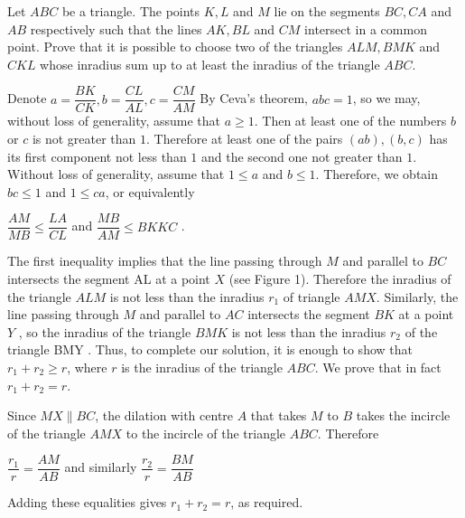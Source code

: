 \documentclass{subfile}
\begin{document}
	\begin{problem}
		Let $ABC$ be a triangle. The points $K, L$ and $M$ lie on the segments $BC, CA$ and $AB$ respectively such that the lines $AK, BL$ and $CM$ intersect in a common point. Prove that it is possible to choose two of the triangles $ALM, BMK$ and $CKL$ whose inradius sum up to at least the inradius of the triangle $ABC$.
	\end{problem}
	\begin{solution}
		 Denote $a=\dfrac{BK}{CK},b=\dfrac{CL}{AL},c=\dfrac{CM}{AM}$
		 By Ceva's theorem, $abc=1$, so we may, without loss of generality, assume that $a\geq1$. Then at
		 least one of the numbers $b$ or $c$ is not greater than $1$. Therefore at least one of the pairs $(ab),
		 (b,c)$ has its first component not less than $1$ and the second one not greater than $1$. Without
		 loss of generality, assume that $1\leq a$ and $b\leq 1$.
		 Therefore, we obtain $bc\leq 1$ and $1\leq ca$, or equivalently
		 \begin{center} 
		 	$\dfrac{AM}{MB}\leq \dfrac{LA}{CL}$ and $\dfrac{MB}{AM}\leq {BK}{KC}$ .
		 \end{center}
		 The first inequality implies that the line passing through $M$ and parallel to $BC$ intersects the
		 segment AL at a point $X$ (see Figure 1). Therefore the inradius of the triangle $ALM$ is not
		 less than the inradius $r_1$ of triangle $AMX$.
		 Similarly, the line passing through $M$ and parallel to $AC$ intersects the segment $BK$ at
		 a point $Y$ , so the inradius of the triangle $BMK$ is not less than the inradius $r_2$ of the triangle
		 BMY . Thus, to complete our solution, it is enough to show that $r_1+r_2\geq r$, where $r$ is
		 the inradius of the triangle $ABC$. We prove that in fact $r_1+r_2=r$.
		 
		 Since $MX\parallel BC$, the dilation with centre $A$ that takes $M$ to $B$ takes the incircle of the
		 triangle $AMX$ to the incircle of the triangle $ABC$. Therefore
		 \begin{center}$\dfrac{r_1}{r}=\dfrac{AM}{AB}$ and similarly $\dfrac{r_2}{r}=\dfrac{BM}{AB}$
		 	
		 	
		 \end{center}
		 Adding these equalities gives $r_1+r_2=r$, as required.
		\end{solution}
		 
\end{document}
